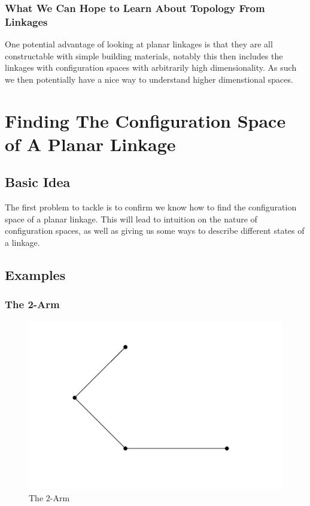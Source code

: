 \documentclass{article}
\begin{document}
\subsubsection{What We Can Hope to Learn About Topology From Linkages}

One potential advantage of looking at planar linkages is that they are all constructable with simple building materials, notably this then includes the linkages with configuration spaces with arbitrarily high dimensionality. As such we then potentially have a nice way to understand higher dimenstional spaces. 

\section{Finding The Configuration Space of A Planar Linkage}

\subsection{Basic Idea}

The first problem to tackle is to confirm we know how to find the configuration space of a planar linkage. This will lead to intuition on the nature of configuration spaces, as well as giving us some ways to describe different states of a linkage.

\subsection{Examples}

\subsubsection{The 2-Arm}

\begin{figure}[h!]
\centering
\includegraphics[scale=0.5]{./images/2-arm}
\caption{The 2-Arm}
\label{fig:The 2-Arm}
\end{figure}
\end{document}
